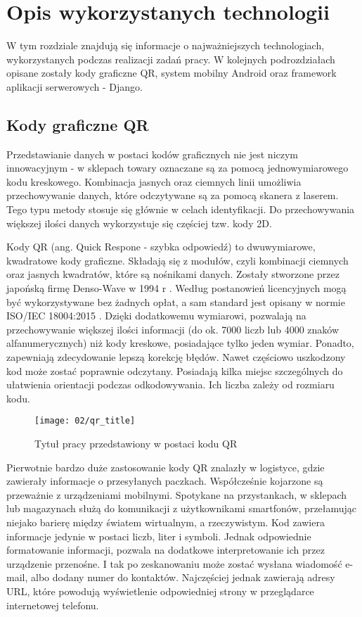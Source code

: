 \section{Opis wykorzystanych technologii}
W tym rozdziale znajdują się informacje o najważniejszych technologiach, wykorzystanych podczas realizacji zadań pracy. W kolejnych podrozdziałach opisane zostały kody graficzne QR, system mobilny Android oraz framework aplikacji serwerowych - Django. 

\subsection{Kody graficzne QR}
Przedstawianie danych w postaci kodów graficznych nie jest niczym innowacyjnym - w sklepach towary oznaczane są za pomocą jednowymiarowego kodu kreskowego. Kombinacja jasnych oraz ciemnych linii umożliwia przechowywanie danych, które odczytywane są za pomocą skanera z laserem. Tego typu metody stosuje się głównie w celach identyfikacji. Do przechowywania większej ilości danych wykorzystuje się częściej tzw. kody 2D.

Kody QR (ang. Quick Respone - szybka odpowiedź) to dwuwymiarowe, kwadratowe kody graficzne. Składają się z modułów, czyli kombinacji ciemnych oraz jasnych kwadratów, które są nośnikami danych. Zostały stworzone przez japońską firmę Denso-Wave w 1994 r \cite{thonky_tutorial}. Według postanowień licencyjnych mogą być wykorzystywane bez żadnych opłat, a sam standard jest opisany w normie ISO/IEC 18004:2015 \cite{norma_qr}. Dzięki dodatkowemu wymiarowi, pozwalają na przechowywanie większej ilości informacji (do ok. 7000 liczb lub 4000 znaków alfanumerycznych) niż kody kreskowe, posiadające tylko jeden wymiar. Ponadto, zapewniają zdecydowanie lepszą korekcję błędów. Nawet częściowo uszkodzony kod może zostać poprawnie odczytany. Posiadają kilka miejsc szczególnych do ułatwienia orientacji podczas odkodowywania. Ich liczba zależy od rozmiaru kodu.

\begin{figure}[h]
	\begin{center}
		\texttt{[image: 02/qr\_title]}
	\end{center}
	\caption{Tytuł pracy przedstawiony w postaci kodu QR}
	\vspace{-0.3cm}
\end{figure}

Pierwotnie bardzo duże zastosowanie kody QR znalazły w logistyce, gdzie zawierały informacje o przesyłanych paczkach. Współcześnie kojarzone są przeważnie z urządzeniami mobilnymi. Spotykane na przystankach, w sklepach lub magazynach służą do komunikacji z użytkownikami smartfonów, przełamując niejako barierę między światem wirtualnym, a rzeczywistym. Kod zawiera informacje jedynie w postaci liczb, liter i symboli. Jednak odpowiednie formatowanie informacji, pozwala na dodatkowe interpretowanie ich przez urządzenie przenośne. I tak po zeskanowaniu może zostać wysłana wiadomość e-mail, albo dodany numer do kontaktów. Najczęściej jednak zawierają adresy URL, które powodują wyświetlenie odpowiedniej strony w przeglądarce internetowej telefonu.

